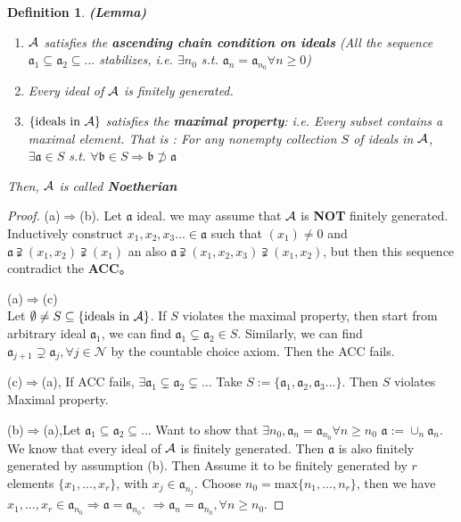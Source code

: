 \documentclass[11pt]{article}
\newtheorem{dfn}[thm]{Definition}
\newcommand{\sca}{{\mathfrak a}}
\newcommand{\scb}{{\mathfrak b}}
\newcommand{\cala}{{\cal A}}
\newcommand{\Lrta}{\Longrightarrow}
\begin{document}
\begin{dfn}
\textbf{(Lemma)} 
\begin{enumerate}[label=(\alph*)]
\item $\cala$ satisfies the \textbf{ascending chain condition on ideals} (All the sequence $\sca_1\subseteq \sca_2\subseteq ...$ stabilizes, i.e. $\exists n_0$ s.t. $\sca_n=\sca_{n_0} \forall n\geq 0$)
\item Every ideal of $\cala$ is finitely generated.
\item $\{\text{ideals in $\cala$}\}$ satisfies the \textbf{maximal property}: i.e. Every subset contains a maximal element. That is : For any nonempty collection $S$ of ideals in $\cala$, $\exists \sca\in S$ s.t. $\forall \scb\in S\Lrta \scb\not \supset \sca$
\end{enumerate}
Then, $\cala$ is called \textbf{Noetherian}
\end{dfn}
\begin{proof}
(a)$\Lrta$(b). Let $\sca$ ideal. we may assume that $\cala$ is \textbf{NOT} finitely generated. Inductively construct $x_1, x_2,x_3...\in \sca$ such that $(x_1)\neq 0$ and $\sca\supsetneqq(x_1,x_2)\supsetneqq(x_1)$ an also $\sca\supsetneqq(x_1,x_2,x_3)\supsetneqq(x_1,x_2)$, but then this sequence contradict the \textbf{ACC}。

(a)$\Lrta$(c)\\
Let $\emptyset \neq S\subseteq \{\text{ideals in }\cala\}$. If $S$ violates the maximal property, then start from arbitrary ideal $\sca_1$, we can find $\sca_1\subsetneq \sca_2\in S$. Similarly, we can find $\sca_{j+1}\supsetneq \sca_j,\forall j\in\mathcal{N}$ by the countable choice axiom. Then the ACC fails.

(c)$\Lrta $(a), If ACC fails, $\exists \sca_1\subsetneq \sca_2\subsetneq ...$ Take $S:=\{\sca_1,\sca_2,\sca_3...\}$. Then $S$ violates Maximal property.

(b)$\Lrta$(a),Let $\sca_1\subseteq\sca_2\subseteq ...$ Want to show that $\exists n_0,\sca_n=\sca_{n_0}\forall n\geq n_0$ $\sca:=\cup_n \sca_n$. We know that every ideal of $\cala$ is finitely generated. Then $\sca$ is also finitely generated by assumption (b). Then Assume it to be finitely generated by $r$ elements $\{x_1,...,x_r\}$, with $x_j\in\sca_{n_j}$. Choose $n_0=\text{max}\{n_1,...,n_r\}$, then we have $x_1,...,x_r\in \sca_{n_0}\Lrta \sca=\sca_{n_0}$. $\Lrta \sca_n=\sca_{n_0},\forall n\geq n_0$.
\end{proof}
\end{document}

